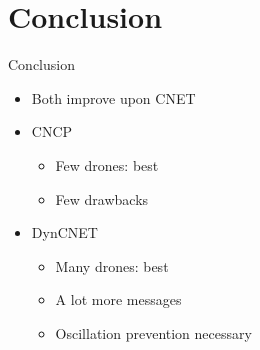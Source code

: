 \documentclass{beamer}
\begin{document}
	\section{Conclusion}
	\begin{frame}{Conclusion}
		\begin{itemize}
			\item Both improve upon CNET
			\item CNCP
				\begin{itemize}
				\item Few drones: best
				\item Few drawbacks
				\end{itemize}
			\item DynCNET
				\begin{itemize}
				\item Many drones: best
				\item A lot more messages
				\item Oscillation prevention necessary
				\end{itemize}
		\end{itemize}
	\end{frame}
	
\end{document}
